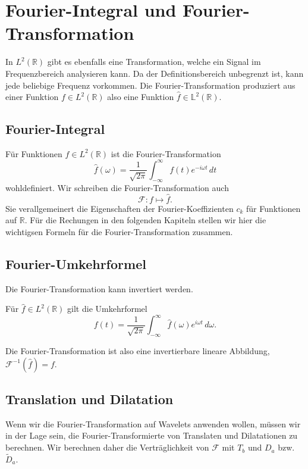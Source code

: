%
%
%
\section{Fourier-Integral und Fourier-Transformation
\label{section:fourier-integral}}
In $L^2(\mathbb R)$ gibt es ebenfalls eine Transformation, welche
ein Signal im Frequenzbereich analysieren kann.
Da der Definitionsbereich unbegrenzt ist, kann jede beliebige Frequenz
vorkommen.
Die Fourier-Transformation produziert aus einer Funktion $f\in L^2(\mathbb R)$
also eine Funktion $\hat{f}\in\mathbb L^2(\mathbb R)$.

\subsection{Fourier-Integral
\label{subsection:fourier-integral}}
%
Für Funktionen $f\in L^2(\mathbb R)$ ist die Fourier-Transformation
\[
\hat{f}(\omega)
=
\frac{1}{\sqrt{2\pi}}
\int_{-\infty}^\infty f(t)e^{-i\omega t}\,dt
\]
wohldefiniert.
Wir schreiben die Fourier-Transformation auch
\[
\mathcal{F}\colon f\mapsto \hat{f}.
\]
Sie verallgemeinert die Eigenschaften der Fourier-Koeffizienten $c_k$
für Funktionen auf $\mathbb R$.
Für die Rechungen in den folgenden Kapiteln stellen wir hier die
wichtigsen Formeln für die Fourier-Transformation zusammen.

\subsection{Fourier-Umkehrformel
\label{subsection:fourier-umkehrformel}}
Die Fourier-Transformation kann invertiert werden.
%

\begin{satz}
Für $\hat{f}\in L^2(\mathbb R)$ gilt die Umkehrformel
\[
f(t)
=
\frac{1}{\sqrt{2\pi}}
\int_{-\infty}^{\infty} \hat{f}(\omega)e^{i\omega t}\,d\omega.
\]
\end{satz}

Die Fourier-Transformation ist also eine invertierbare lineare Abbildung,
$\mathcal{F}^{-1}\!(\hat{f}) = f$.

\subsection{Translation und Dilatation
\label{subsection:ft-translation-und-dilatation}}
Wenn wir die Fourier-Transformation auf Wavelets anwenden wollen, müssen
wir in der Lage sein, die Fourier-Transformierte von Translaten und
Dilatationen zu berechnen.
Wir berechnen daher die Verträglichkeit von $\mathcal{F}$ mit $T_b$ und
$D_a$ bzw.~$\tilde{D}_a$.

